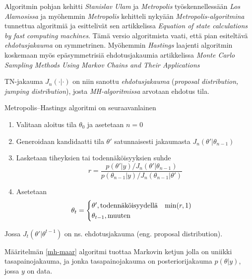 Algoritmin pohjan kehitti \textit{Stanislav Ulam} ja \textit{Metropolis} työskennellessään \textit{Los Alamosissa} ja myöhemmin \textit{Metropolis} kehitteli nykyään \textit{Metropolis-algoritmina} tunnettua algoritmiä ja esittelivät sen artikkelissa \textit{Equation of state calculations by fast computing machines}\cite{metropolis_nicholas_equation_1953}. Tämä versio algoritmista vaati, että pian esiteltävä \textit{ehdotusjakauma} on symmetrinen. Myöhemmin \textit{Hastings} laajenti algoritmin koskemaan myös epäsymmetrisiä ehdotusjakaumia artikkelissa \textit{Monte Carlo Sampling Methods Using Markov Chains and Their Applications}

\begin{merk}
	TN-jakauma $J_n(\cdot|\cdot)$ on niin sanottu \textit{ehdotusjakauma} (\textit{proposal distribution, jumping distribution}), josta \textit{MH-algoritmissa} arvotaan ehdotus tila.
\end{merk}

\begin{maar}\label{mh-maar}
	Metropolis--Hastings algoritmi on seuraavanlainen
	\begin{enumerate}
		\item Valitaan aloitus tila $\theta_0$ ja asetetaan $n=0$
		\item Generoidaan kandidaatti tila $\theta'$ satunnaisesti jakaumasta $J_n(\theta'|\theta_{n-1})$
		\item Lasketaan tiheyksien tai todennäköisyyksien suhde
		\begin{displaymath}
			r = \frac{p(\theta'|y)/J_n(\theta'|\theta_{n-1})}{p(\theta_{n-1}|y)/J_n(\theta_{n-1}|\theta')}
		\end{displaymath}
		\item Asetetaan
		\begin{displaymath}
			\theta_t= 
			\begin{cases}
				\theta', \text{todennäköisyydellä} \hspace{0.3cm} \min(r,1) \\
				\theta_{t-1}, \text{muuten}
			\end{cases}
		\end{displaymath}
	\end{enumerate}
	Jossa $J_t(\theta'|\theta^{t-1})$ on ns. ehdotusjakauma (eng. proposal distribution).
\end{maar}

\begin{lause}
	Määritelmän \ref{mh-maar} algoritmi tuottaa Markovin ketjun jolla on uniikki tasapainojakauma, ja jonka tasapainojakauma on posteriorijakauma $p(\theta|y)$, jossa $y$ on data. 
\end{lause}

